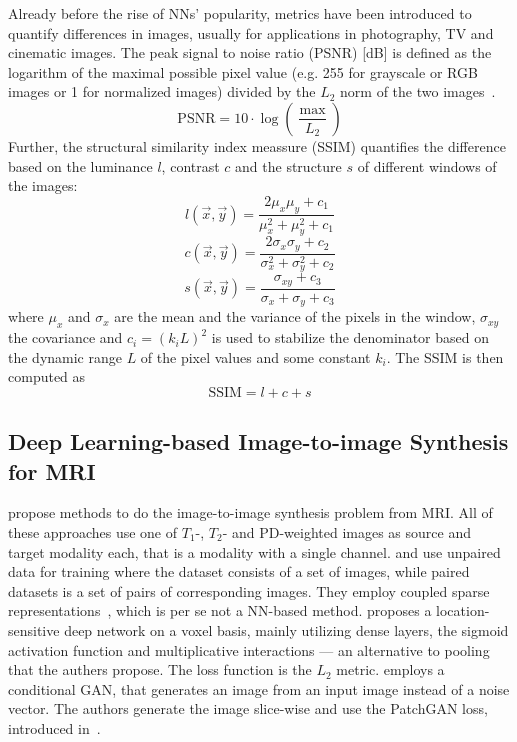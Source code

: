 Already before the rise of NNs' popularity, metrics have been introduced to quantify differences in images, usually for applications in photography, TV and cinematic images.
The peak signal to noise ratio (PSNR) [dB] is defined as the logarithm of the maximal possible pixel value (e.g. 255 for grayscale or RGB images or 1 for normalized images) divided by the $L_2$ norm of the two images~\autocite{rao_transform_2018}.
\[ \text{PSNR} = 10 \cdot \log \left( \frac{\max}{L_2} \right) \]
Further, the structural similarity index meassure (SSIM) quantifies the difference based on the luminance $l$, contrast $c$ and the structure $s$ of different windows of the images:
\[ l(\overrightarrow{x}, \overrightarrow{y}) = \frac{2 \mu_x \mu_y + c_1}{\mu_x^2 + \mu_y^2 + c_1} \]
\[ c(\overrightarrow{x}, \overrightarrow{y}) = \frac{2 \sigma_x \sigma_y + c_2}{\sigma_x^2 + \sigma_y^2 + c_2} \]
\[ s(\overrightarrow{x}, \overrightarrow{y}) = \frac{\sigma_{xy} + c_3}{\sigma_x + \sigma_y + c_3} \]
where $\mu_x$ and $\sigma_x$ are the mean and the variance of the pixels in the window, $\sigma_{xy}$ the covariance and $c_i = (k_i L)^2$ is used to stabilize the denominator based on the dynamic range $L$ of the pixel values and some constant $k_i$.
The SSIM is then computed as
\[ \text{SSIM} = l + c + s \]


\subsection{Deep Learning-based Image-to-image Synthesis for MRI}
\autocite{van_nguyen_cross-domain_2015, huang_simultaneous_2017, vemulapalli_unsupervised_2015, yang_mri_2020} propose methods to do the image-to-image synthesis problem from MRI.
All of these approaches use one of $T_1$-, $T_2$- and PD-weighted images as source and target modality each, that is a modality with a single channel.
\autocite{vemulapalli_unsupervised_2015} and \autocite{huang_simultaneous_2017} use unpaired data for training where the dataset consists of a set of images, while paired datasets is a set of pairs of corresponding images.
They employ coupled sparse representations~\autocite{hutchison_robust_2013}, which is per se not a NN-based method.
\autocite{van_nguyen_cross-domain_2015} proposes a location-sensitive deep network on a voxel basis, mainly utilizing dense layers, the sigmoid activation function and multiplicative interactions --- an alternative to pooling that the authers propose.
The loss function is the $L_2$ metric.
\autocite{yang_mri_2020} employs a conditional GAN, that generates an image from an input image instead of a noise vector. The authors generate the image slice-wise and use the PatchGAN loss, introduced in~\autocite{isola_image-image_2017}. \\

